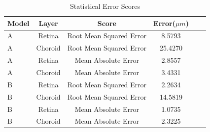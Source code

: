 \documentclass[12pt,a4paper]{scrartcl}
\begin{document}
\begin{table}[H]
    \begin{tabular}{l c|c|c|c|c}
         \textbf{Model} &\textbf{Layer} & \textbf{Score}& \textbf{Error($\mu m$)}  \\
         \hline
         A & Retina & Root Mean Squared Error &  8.5793 \\
         A & Choroid & Root Mean Squared Error & 25.4270 \\
         A & Retina & Mean Absolute Error & 2.8557 \\
         A & Choroid & Mean Absolute Error & 3.4331 \\
         B & Retina & Root Mean Squared Error & 2.2634 \\
         B & Choroid & Root Mean Squared Error & 14.5819 \\
         B & Retina & Mean Absolute Error & 1.0735 \\
         B & Choroid & Mean Absolute Error & 2.3225 \\
    \end{tabular}
    \caption{Statistical Error Scores}
    \label{tab:Error_Scores}
\end{table}
\end{document}
